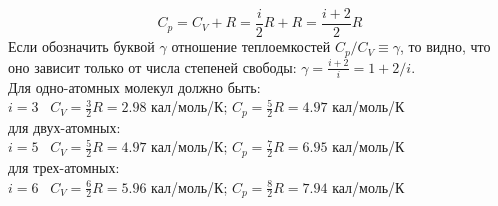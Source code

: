 \documentclass[12pt,epsfig,color,russian]{article}
\begin{document}
\begin{displaymath}
C_p=C_V+R=\frac i2R+R=\frac{i+2}2R
\end{displaymath}
Если обозначить буквой $\gamma$ отношение теплоемкостей $C_p/C_V\equiv \gamma$, то видно, что оно зависит только от числа степеней свободы: $\gamma=\frac{i+2}i=1+2/i$. \\
Для одно-атомных молекул должно быть:\\
\hspace*{10mm}  $i=3\;\;\;C_V=\frac32R=2.98$ кал/моль/К; $C_p=\frac52R=4.97$ кал/моль/К\\
для двух-атомных:\\
\hspace*{10mm}  $i=5\;\;\;C_V=\frac52R=4.97$ кал/моль/К; $C_p=\frac72R=6.95$ кал/моль/К\\
для трех-атомных:\\
\hspace*{10mm}  $i=6\;\;\;C_V=\frac62R=5.96$ кал/моль/К; $C_p=\frac82R=7.94$ кал/моль/К\\
\end{document}
